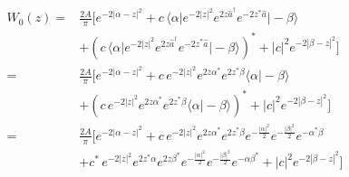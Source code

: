 \begin{align*} 
W_0(z) = & \frac{2A}{\pi} \bigg[ e^{-2|\alpha - z|^2} +  c \,\langle \alpha\vert e^{-2\vert z\vert^{2}} e^{2z\hat{a}^{\dagger}} e^{-2z^{*}\hat{a}} \vert-\beta\rangle  \\ & + \left(c \,\langle \alpha\vert e^{-2\vert z\vert^{2}} e^{2z\hat{a}^{\dagger}} e^{-2z^{*}\hat{a}} \vert-\beta\rangle\right)^{*} + |c|^2 e^{-2|\beta - z|^2} \bigg] \\
= & \frac{2A}{\pi} \bigg[ e^{-2|\alpha - z|^2} +  c \, e^{-2\vert z\vert^{2}} e^{2z\alpha^{*}} e^{2z^{*}\beta} \langle \alpha \vert -\beta\rangle  \\ & + \left( c \, e^{-2\vert z\vert^{2}} e^{2z\alpha^{*}} e^{2z^{*}\beta} \langle \alpha \vert -\beta\rangle\right)^{*} + |c|^2 e^{-2|\beta - z|^2} \bigg] \\
= & \frac{2A}{\pi} \bigg[ e^{-2|\alpha - z|^2} +  c \, e^{-2\vert z\vert^{2}} e^{2z\alpha^{*}} e^{2z^{*}\beta} e^{-\frac{\vert\alpha\vert^{2}}{2}}e^{-\frac{\vert\beta\vert^{2}}{2}}e^{-\alpha^{*}\beta} \\ & + c^{*} \, e^{-2\vert z\vert^{2}} e^{2z^{*}\alpha} e^{2z\beta^{*}} e^{-\frac{\vert\alpha\vert^{2}}{2}}e^{-\frac{\vert\beta\vert^{2}}{2}}e^{-\alpha\beta^{*}} + |c|^2 e^{-2|\beta - z|^2} \bigg] \\
\end{align*}
